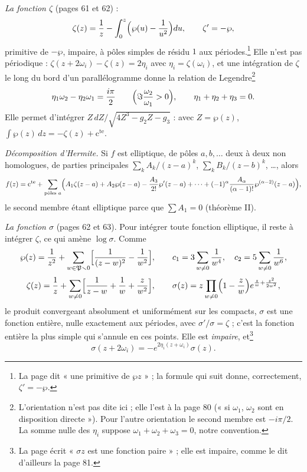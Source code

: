 \documentclass[11pt,a4paper]{article}
\begin{document}
\emph{La fonction $\zeta$} (pages 61 et 62) :
\[
\zeta(z) = \frac1z - \int_0^z \Bigl(\wp(u) - \frac{1}{u^2}\Bigr)du,
\qquad \zeta' = -\wp ,
\]
primitive de $-\wp$, impaire, à pôles simples de résidu $1$ aux
périodes.\footnote{La page dit « une primitive de $\wp z$ » ; la formule qui
suit donne, correctement, $\zeta' = -\wp$.} Elle n'est pas périodique :
$\zeta(z + 2\omega_i) - \zeta(z) = 2\eta_i$ avec $\eta_i = \zeta(\omega_i)$, et
une intégration de $\zeta$ le long du bord d'un parallélogramme donne la
relation de Legendre\footnote{L'orientation n'est pas dite ici ; elle l'est à la page 80 (« si
$\omega_1$, $\omega_2$ sont en disposition directe »). Pour l'autre orientation
le second membre est $-i\pi/2$. La somme nulle des $\eta_i$ suppose $\omega_1 +
\omega_2 + \omega_3 = 0$, notre convention.}
\[
\eta_1\omega_2 - \eta_2\omega_1 = \frac{i\pi}{2}
\qquad \Bigl(\Im\frac{\omega_2}{\omega_1} > 0\Bigr),
\qquad \eta_1 + \eta_2 + \eta_3 = 0 .
\]
Elle permet d'intégrer $Z\,dZ /
\sqrt{4Z^3 - g_2Z - g_3}$ : avec $Z = \wp(z)$, $\int \wp(z)\,dz = -\zeta(z) +
\text{c}^{\text{te}}$.

\emph{Décomposition d'Hermite.} Si $f$ est elliptique, de pôles $a, b,
\ldots$ deux à deux non homologues, de parties principales $\sum_k
A_k/(z-a)^k$, $\sum_k B_k/(z-b)^k$, \ldots, alors
\[
f(z) = \text{c}^{\text{te}} + \sum_{\text{pôles } a}\Bigl( A_1\zeta(z-a) +
A_2\wp(z-a) - \frac{A_3}{2!}\wp'(z-a) + \cdots + (-1)^\alpha
\frac{A_\alpha}{(\alpha-1)!}\wp^{(\alpha-2)}(z-a)\Bigr),
\]
le second membre étant elliptique parce que $\sum A_1 = 0$ (théorème II).

\emph{La fonction $\sigma$} (pages 62 et 63). Pour intégrer toute fonction
elliptique, il reste à intégrer $\zeta$, ce qui amène $\log\sigma$. Comme
\[
\wp(z) = \frac{1}{z^2} + \sum_{w \in \mathfrak{P}\smallsetminus 0}
\Bigl[\frac{1}{(z-w)^2} - \frac{1}{w^2}\Bigr],
\qquad c_1 = 3\sum_{w \neq 0} \frac{1}{w^4},\quad c_2 = 5\sum_{w \neq 0}
\frac{1}{w^6},
\]
\[
\zeta(z) = \frac1z + \sum_{w \neq 0}\Bigl[\frac{1}{z-w} + \frac1w +
\frac{z}{w^2}\Bigr],
\qquad
\sigma(z) = z\prod_{w \neq 0}\Bigl(1 - \frac{z}{w}\Bigr)e^{\frac{z}{w} +
\frac{z^2}{2w^2}},
\]
le produit convergeant absolument et uniformément sur les compacts, $\sigma$
est une fonction entière, nulle exactement aux périodes, avec $\sigma'/\sigma =
\zeta$ ; c'est la fonction entière la plus simple qui s'annule en ces points. Elle
est \emph{impaire}, et\footnote{La page écrit « $\sigma z$ est une fonction paire » ; elle est
impaire, comme le dit d'ailleurs la page 81.}
\[
\sigma(z + 2\omega_i) = -e^{2\eta_i(z + \omega_i)}\sigma(z) .
\]
\end{document}
